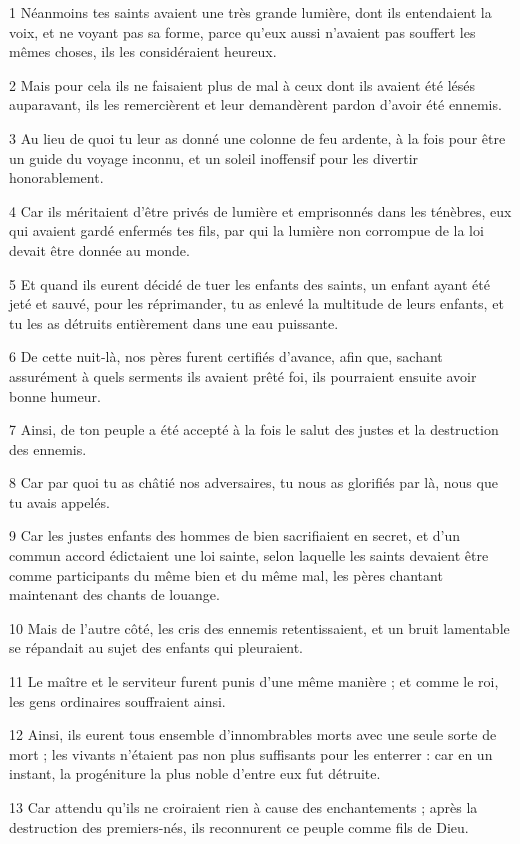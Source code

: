\par 1 Néanmoins tes saints avaient une très grande lumière, dont ils entendaient la voix, et ne voyant pas sa forme, parce qu'eux aussi n'avaient pas souffert les mêmes choses, ils les considéraient heureux.
\par 2 Mais pour cela ils ne faisaient plus de mal à ceux dont ils avaient été lésés auparavant, ils les remercièrent et leur demandèrent pardon d'avoir été ennemis.
\par 3 Au lieu de quoi tu leur as donné une colonne de feu ardente, à la fois pour être un guide du voyage inconnu, et un soleil inoffensif pour les divertir honorablement.
\par 4 Car ils méritaient d'être privés de lumière et emprisonnés dans les ténèbres, eux qui avaient gardé enfermés tes fils, par qui la lumière non corrompue de la loi devait être donnée au monde.
\par 5 Et quand ils eurent décidé de tuer les enfants des saints, un enfant ayant été jeté et sauvé, pour les réprimander, tu as enlevé la multitude de leurs enfants, et tu les as détruits entièrement dans une eau puissante.
\par 6 De cette nuit-là, nos pères furent certifiés d'avance, afin que, sachant assurément à quels serments ils avaient prêté foi, ils pourraient ensuite avoir bonne humeur.
\par 7 Ainsi, de ton peuple a été accepté à la fois le salut des justes et la destruction des ennemis.
\par 8 Car par quoi tu as châtié nos adversaires, tu nous as glorifiés par là, nous que tu avais appelés.
\par 9 Car les justes enfants des hommes de bien sacrifiaient en secret, et d'un commun accord édictaient une loi sainte, selon laquelle les saints devaient être comme participants du même bien et du même mal, les pères chantant maintenant des chants de louange.
\par 10 Mais de l'autre côté, les cris des ennemis retentissaient, et un bruit lamentable se répandait au sujet des enfants qui pleuraient.
\par 11 Le maître et le serviteur furent punis d'une même manière ; et comme le roi, les gens ordinaires souffraient ainsi.
\par 12 Ainsi, ils eurent tous ensemble d'innombrables morts avec une seule sorte de mort ; les vivants n'étaient pas non plus suffisants pour les enterrer : car en un instant, la progéniture la plus noble d'entre eux fut détruite.
\par 13 Car attendu qu'ils ne croiraient rien à cause des enchantements ; après la destruction des premiers-nés, ils reconnurent ce peuple comme fils de Dieu.
